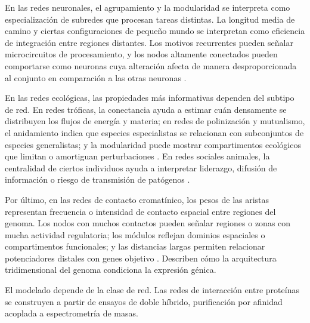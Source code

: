 \documentclass[11pt]{article}
\begin{document}
En las redes neuronales, el agrupamiento y la modularidad se interpreta como especialización de subredes que procesan tareas distintas. La longitud media de camino y ciertas configuraciones de pequeño mundo se interpretan como eficiencia de integración entre regiones distantes. Los motivos recurrentes pueden señalar microcircuitos de procesamiento, y los nodos altamente conectados pueden comportarse como neuronas cuya alteración afecta de manera desproporcionada al conjunto en comparación a las otras neuronas \parencite{BullmoreSporns2009,Mittal2024}. 


En las redes ecológicas, las propiedades más informativas dependen del subtipo de red. En redes tróficas, la conectancia ayuda a estimar cuán densamente se distribuyen los flujos de energía y materia; en redes de polinización y mutualismo, el anidamiento indica que especies especialistas se relacionan con subconjuntos de especies generalistas; y la modularidad puede mostrar compartimentos ecológicos que limitan o amortiguan perturbaciones \parencite{Bascompte2009,Olesen2007,Dunne2002}. En redes sociales animales, la centralidad de ciertos individuos ayuda a interpretar liderazgo, difusión de información o riesgo de transmisión de patógenos \parencite{KrauseLusseauJames2009}. 

Por último, en las redes de contacto cromatínico, los pesos de las aristas representan frecuencia o intensidad de contacto espacial entre regiones del genoma. Los nodos con muchos contactos pueden señalar regiones o zonas con mucha actividad regulatoria; los módulos reflejan dominios espaciales o compartimentos funcionales; y las distancias largas permiten relacionar potenciadores distales con genes objetivo \parencite{Beagrie2017}. Describen cómo la arquitectura tridimensional del genoma condiciona la expresión génica.
 



El modelado depende de la clase de red. Las redes de interacción entre proteínas se construyen a partir de ensayos de doble híbrido, purificación por afinidad acoplada a espectrometría de masas. 
\end{document}
